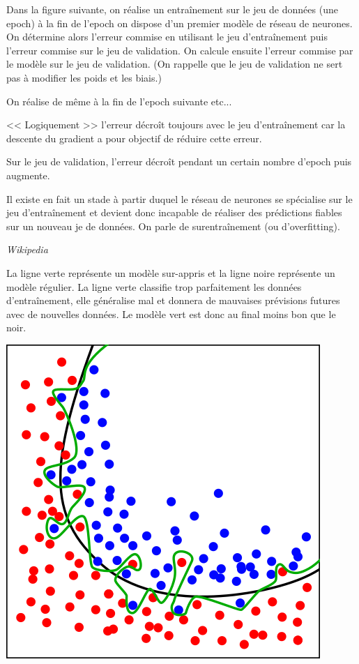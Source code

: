Dans la figure suivante, on réalise un entraînement sur le jeu de données (une epoch) à la fin de l'epoch on dispose d'un premier modèle de réseau de neurones.  On détermine alors l'erreur commise en utilisant le jeu d'entraînement puis l'erreur commise sur le jeu de validation.  On calcule ensuite l'erreur commise par le modèle sur le jeu de validation. (On rappelle que le jeu de validation ne sert pas à modifier les poids et les biais.)

On réalise de même à la fin de l'epoch suivante etc...

<< Logiquement >> l'erreur décroît toujours avec le jeu d’entraînement car la descente du gradient a pour objectif de réduire cette erreur. 

Sur le jeu de validation, l'erreur décroît pendant un certain nombre d'epoch puis augmente. 

Il existe en fait un stade à partir duquel le réseau de neurones se spécialise sur le jeu d’entraînement et devient donc incapable de réaliser des prédictions fiables sur un nouveau je de données. On parle de surentraînement (ou d'overfitting).
 
\begin{exemple} \textit{Wikipedia} ~\\
\begin{minipage}[c]{.45\linewidth}
La ligne verte représente un modèle sur-appris et la ligne noire représente un modèle régulier. La ligne verte classifie trop parfaitement les données d’entraînement, elle généralise mal et donnera de mauvaises prévisions futures avec de nouvelles données. Le modèle vert est donc au final moins bon que le noir.
\end{minipage} \hfill
\begin{minipage}[c]{.45\linewidth}
\begin{center}
\includegraphics[width=.7\linewidth]{images/fig_07_overfitting}
\end{center}
\end{minipage} 
\end{exemple}



